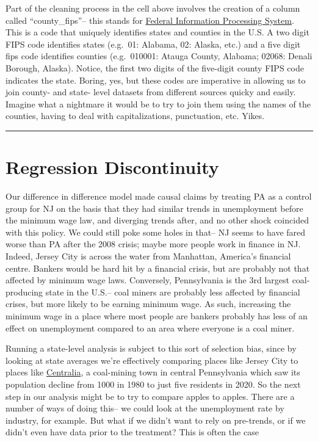 \documentclass[
  letterpaper,
  DIV=11,
  numbers=noendperiod]{scrreprt}
\begin{document}
Part of the cleaning process in the cell above involves the creation of
a column called ``county\_fips''-- this stands for
\href{https://transition.fcc.gov/oet/info/maps/census/fips/fips.txt\#:~:text=FIPS\%20codes\%20are\%20numbers\%20which,to\%20which\%20the\%20county\%20belongs.}{Federal
Information Processing System}. This is a code that uniquely identifies
states and counties in the U.S. A two digit FIPS code identifies states
(e.g.~01: Alabama, 02: Alaska, etc.) and a five digit fips code
identifies counties (e.g.~010001: Atauga County, Alabama; 02068: Denali
Borough, Alaska). Notice, the first two digits of the five-digit county
FIPS code indicates the state. Boring, yes, but these codes are
imperative in allowing us to join county- and state- level datasets from
different sources quicky and easily. Imagine what a nightmare it would
be to try to join them using the names of the counties, having to deal
with capitalizations, punctuation, etc. Yikes.

\begin{center}\rule{0.5\linewidth}{0.5pt}\end{center}

\hypertarget{regression-discontinuity}{%
\section{Regression Discontinuity}\label{regression-discontinuity}}

Our difference in difference model made causal claims by treating PA as
a control group for NJ on the basis that they had similar trends in
unemployment before the minimum wage law, and diverging trends after,
and no other shock coincided with this policy. We could still poke some
holes in that-- NJ seems to have fared worse than PA after the 2008
crisis; maybe more people work in finance in NJ. Indeed, Jersey City is
across the water from Manhattan, America's financial centre. Bankers
would be hard hit by a financial crisis, but are probably not that
affected by minimum wage laws. Conversely, Pennsylvania is the 3rd
largest coal-producing state in the U.S.-- coal miners are probably less
affected by financial crises, but more likely to be earning minimum
wage. As such, increasing the minimum wage in a place where most people
are bankers probably has less of an effect on unemployment compared to
an area where everyone is a coal miner.

Running a state-level analysis is subject to this sort of selection
bias, since by looking at state averages we're effectively comparing
places like Jersey City to places like
\href{https://en.wikipedia.org/wiki/Centralia,_Pennsylvania}{Centralia},
a coal-mining town in central Pennsylvania which saw its population
decline from 1000 in 1980 to just five residents in 2020. So the next
step in our analysis might be to try to compare apples to apples. There
are a number of ways of doing this-- we could look at the unemployment
rate by industry, for example. But what if we didn't want to rely on
pre-trends, or if we didn't even have data prior to the treatment? This
is often the case
\end{document}
